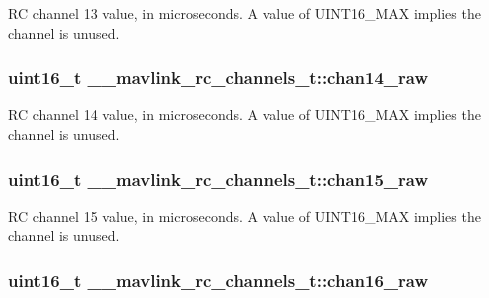 R\+C channel 13 value, in microseconds. A value of U\+I\+N\+T16\+\_\+\+M\+A\+X implies the channel is unused. 

\hypertarget{struct____mavlink__rc__channels__t_ad44a334e66c03dc754b687a214455bb4}{
\subsubsection[{chan14\+\_\+raw}]{\setlength{\rightskip}{0pt plus 5cm}uint16\+\_\+t \+\_\+\+\_\+mavlink\+\_\+rc\+\_\+channels\+\_\+t\+::chan14\+\_\+raw}}\label{struct____mavlink__rc__channels__t_ad44a334e66c03dc754b687a214455bb4}


R\+C channel 14 value, in microseconds. A value of U\+I\+N\+T16\+\_\+\+M\+A\+X implies the channel is unused. 

\hypertarget{struct____mavlink__rc__channels__t_aecba5d673ecb36bd0978b9da0550e87c}{
\subsubsection[{chan15\+\_\+raw}]{\setlength{\rightskip}{0pt plus 5cm}uint16\+\_\+t \+\_\+\+\_\+mavlink\+\_\+rc\+\_\+channels\+\_\+t\+::chan15\+\_\+raw}}\label{struct____mavlink__rc__channels__t_aecba5d673ecb36bd0978b9da0550e87c}


R\+C channel 15 value, in microseconds. A value of U\+I\+N\+T16\+\_\+\+M\+A\+X implies the channel is unused. 

\hypertarget{struct____mavlink__rc__channels__t_a5585d9ec6a1d8aeb172a65386e480aed}{
\subsubsection[{chan16\+\_\+raw}]{\setlength{\rightskip}{0pt plus 5cm}uint16\+\_\+t \+\_\+\+\_\+mavlink\+\_\+rc\+\_\+channels\+\_\+t\+::chan16\+\_\+raw}}\label{struct____mavlink__rc__channels__t_a5585d9ec6a1d8aeb172a65386e480aed}


